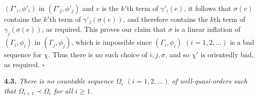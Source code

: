 $(\Gamma'_i, \phi'_i)$ in $(\Gamma'_j, \phi'_j)$ and $v$ is the $k'$th term of $\gamma'_i(e)$, it follows that $\sigma(v)$ contains the $k'$th term of $\gamma'_j(\sigma(e))$, and therefore contains the $k$th term of $\gamma_j(\sigma(e))$, as required. This proves our claim that $\sigma$ is a linear inflation of $(\Gamma_i, \phi_i)$ in $(\Gamma_j, \phi_j)$, which is impossible since $(\Gamma_i, \phi_i)$ $(i = 1, 2, \dots)$ is a bad sequence for $\chi$. Thus there is no such choice of $i, j, \sigma$, and so $\chi'$ is orientedly bad, as required. $\square$

\textbf{4.3.} \textit{There is no countable sequence $\Omega_i$ $(i = 1, 2, \dots)$ of well-quasi-orders such that $\Omega_{i+1} \prec \Omega_i$ for all $i \ge 1$.}
